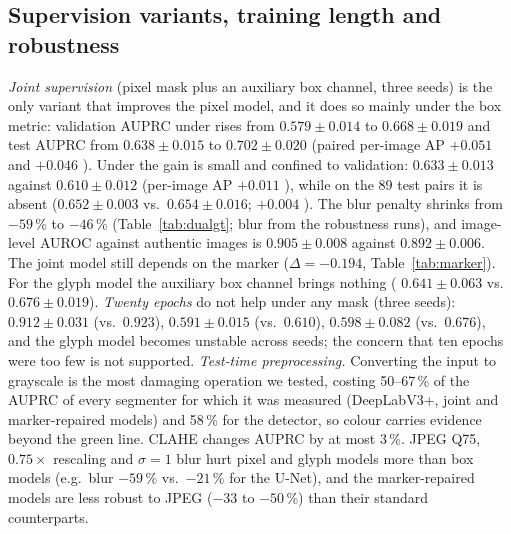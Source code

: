\subsection{Supervision variants, training length and robustness}
\label{sec:res-variants}
\emph{Joint supervision} (pixel mask plus an auxiliary box channel, three seeds) is the only variant that improves the pixel model, and it does so mainly under the box metric: validation AUPRC under \GTb{} rises from $0.579{\pm}0.014$ to $0.668{\pm}0.019$ and test \GTb{} AUPRC from $0.638{\pm}0.015$ to $0.702{\pm}0.020$ (paired per-image AP $+0.051$  and $+0.046$ ). Under \GTp{} the gain is small and confined to validation: $0.633{\pm}0.013$ against $0.610{\pm}0.012$ (per-image AP $+0.011$ ), while on the 89 test pairs it is absent ($0.652{\pm}0.003$ vs.\ $0.654{\pm}0.016$; $+0.004$ ). The blur penalty shrinks from $-59$\,\% to $-46$\,\% (Table~\ref{tab:dualgt}; blur from the robustness runs), and image-level AUROC against authentic images is $0.905{\pm}0.008$ against $0.892{\pm}0.006$. The joint model still depends on the marker ($\Delta{=}-0.194$, Table~\ref{tab:marker}).
For the glyph model the auxiliary box channel brings nothing (\GTg{} $0.641{\pm}0.063$ vs.\ $0.676{\pm}0.019$). \emph{Twenty epochs} do not help under any mask (three seeds): \GTb{} $0.912{\pm}0.031$ (vs.\ $0.923$), \GTp{} $0.591{\pm}0.015$ (vs.\ $0.610$), \GTg{} $0.598{\pm}0.082$ (vs.\ $0.676$), and the glyph model becomes unstable across seeds; the concern that ten epochs were too few is not supported.
\emph{Test-time preprocessing.} Converting the input to grayscale is the most damaging operation we tested, costing 50--67\,\% of the AUPRC of every segmenter for which it was measured (DeepLabV3+, joint and marker-repaired models) and 58\,\% for the detector, so colour carries evidence beyond the green line. CLAHE changes AUPRC by at most 3\,\%. JPEG Q75, $0.75\times$ rescaling and $\sigma{=}1$ blur hurt pixel and glyph models more than box models (e.g.\ blur $-59$\,\% vs.\ $-21$\,\% for the U-Net), and the marker-repaired models are less robust to JPEG ($-33$ to $-50$\,\%) than their standard counterparts.

